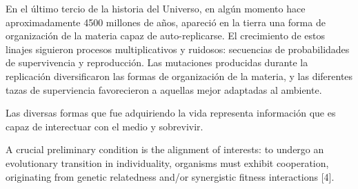 \documentclass[a4paper,10pt]{article}
\begin{document}
En el último tercio de la historia del Universo, en algún momento hace aproximadamente 4500 millones de años, apareció en la tierra una forma de organización de la materia capaz de auto-replicarse.
El crecimiento de estos linajes siguieron procesos multiplicativos y ruidosos: secuencias de probabilidades de supervivencia y reproducción.
Las mutaciones producidas durante la replicación diversificaron las formas de organización de la materia, y las diferentes tazas de superviencia favorecieron a aquellas mejor adaptadas al ambiente.

Las diversas formas que fue adquiriendo la vida representa información que es capaz de interectuar con el medio y sobrevivir.

A crucial preliminary condition is the alignment of interests: to undergo an evolutionary transition in individuality, organisms must exhibit cooperation, originating from genetic relatedness and/or synergistic fitness interactions [4].

{\footnotesize


}
\end{document}
